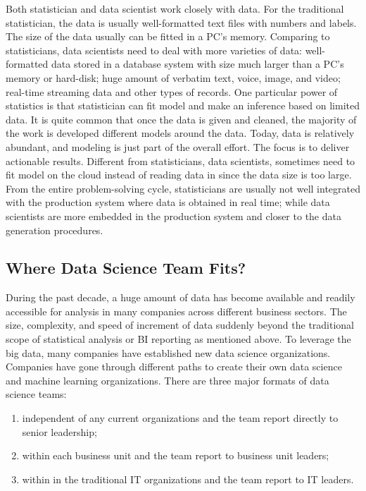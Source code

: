 \documentclass[
]{article}
\providecommand{\tightlist}{%
  \setlength{\itemsep}{0pt}\setlength{\parskip}{0pt}}
\begin{document}
Both statistician and data scientist work closely with data. For the
traditional statistician, the data is usually well-formatted text files
with numbers and labels. The size of the data usually can be fitted in a
PC's memory. Comparing to statisticians, data scientists need to deal
with more varieties of data: well-formatted data stored in a database
system with size much larger than a PC's memory or hard-disk; huge
amount of verbatim text, voice, image, and video; real-time streaming
data and other types of records. One particular power of statistics is
that statistician can fit model and make an inference based on limited
data. It is quite common that once the data is given and cleaned, the
majority of the work is developed different models around the data.
Today, data is relatively abundant, and modeling is just part of the
overall effort. The focus is to deliver actionable results. Different
from statisticians, data scientists, sometimes need to fit model on the
cloud instead of reading data in since the data size is too large. From
the entire problem-solving cycle, statisticians are usually not well
integrated with the production system where data is obtained in real
time; while data scientists are more embedded in the production system
and closer to the data generation procedures.

\hypertarget{where-data-science-team-fits}{%
\subsection{Where Data Science Team
Fits?}\label{where-data-science-team-fits}}

During the past decade, a huge amount of data has become available and
readily accessible for analysis in many companies across different
business sectors. The size, complexity, and speed of increment of data
suddenly beyond the traditional scope of statistical analysis or BI
reporting as mentioned above. To leverage the big data, many companies
have established new data science organizations. Companies have gone
through different paths to create their own data science and machine
learning organizations. There are three major formats of data science
teams:

\begin{enumerate}
\def\labelenumi{(\arabic{enumi})}
\tightlist
\item
  independent of any current organizations and the team report directly
  to senior leadership;\\
\item
  within each business unit and the team report to business unit
  leaders;\\
\item
  within in the traditional IT organizations and the team report to IT
  leaders.
\end{enumerate}
\end{document}
